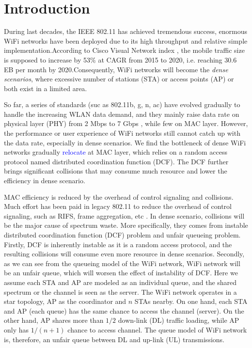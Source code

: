 \documentclass[journal]{IEEEtran}
\begin{document}
\section{Introduction}		\label{Intro}

During last decades, the IEEE 802.11 has achieved tremendous success, enormous WiFi networks have been deployed due to its high throughput and relative simple implementation.According to Cisco Visual Network index \cite{cisco2016}, the mobile traffic size is supposed to increase by 53\% at CAGR from 2015 to 2020, i.e. reaching 30.6 EB per month by 2020.Consequently, WiFi networks will become the \textit{dense scenarios}, where excessive number of stations (STA) or access points (AP) or both exist in a limited area. 

So far, a series of standards (suc as 802.11b, g, n, ac) have evolved gradually to handle the increasing WLAN data demand, and they mainly raise data rate on physical layer (PHY) from 2 Mbps to 7 Gbps \cite{perahia2013next}, while few on MAC layer.
However, the performance or user experience of WiFi networks still cannot catch up with the data rate, especially in dense scenarios. We find the bottleneck of dense WiFi networks gradually \textcolor{blue}{relocate} at MAC layer, which relies on a random access protocol named distributed coordination function (DCF). The DCF further brings significant collisions that may consume much resource and lower the efficiency in dense scenario.

MAC efficiency is reduced by the overhead of control signaling and collisions. Much effort has been paid in legacy 802.11 to reduce the overhead of control signaling, such as RIFS, frame aggregation, etc \cite{perahia2013next}. 
In dense scenario, collisions will be the major cause of spectrum waste. More specifically, they comes from instable distributed coordination function (DCF) problem and unfair queueing problem. Firstly, DCF is inherently instable as it is a random access protocol, and the resulting collisions will consume even more resource in dense scenarios. Secondly, as we can see from the queueing model of the WiFi network, WiFi network will be an unfair queue, which will worsen the effect of instability of DCF. 
Here we assume each STA and AP are modeled as an individual queue, and the shared spectrum or the channel is seen as the server. The WiFi network operates in a star topology, AP as the coordinator and $n$ STAs nearby.
On one hand, each STA and AP  (each queue) has the same chance to access the channel (server). 
On the other hand, AP shares more than $1/2$ down-link (DL) traffic loading, while AP only has $1/(n+1)$ chance to access channel.
The queue model of WiFi network is, therefore, an unfair queue between DL and up-link (UL) transmissions. 
\end{document}
